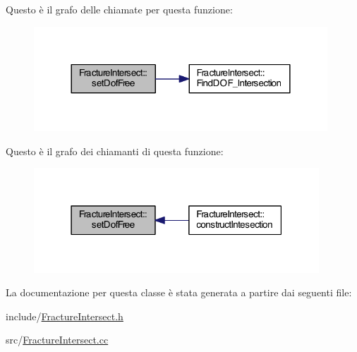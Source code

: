 Questo è il grafo delle chiamate per questa funzione\-:\nopagebreak
\begin{figure}[H]
\begin{center}
\leavevmode
\includegraphics[width=312pt]{classFractureIntersect_a5290dda06af2f6ba24a37f93d3bb4e95_cgraph}
\end{center}
\end{figure}




Questo è il grafo dei chiamanti di questa funzione\-:\nopagebreak
\begin{figure}[H]
\begin{center}
\leavevmode
\includegraphics[width=303pt]{classFractureIntersect_a5290dda06af2f6ba24a37f93d3bb4e95_icgraph}
\end{center}
\end{figure}




La documentazione per questa classe è stata generata a partire dai seguenti file\-:\begin{DoxyCompactItemize}
\item 
include/\hyperlink{FractureIntersect_8h}{Fracture\-Intersect.\-h}\item 
src/\hyperlink{FractureIntersect_8cc}{Fracture\-Intersect.\-cc}\end{DoxyCompactItemize}
